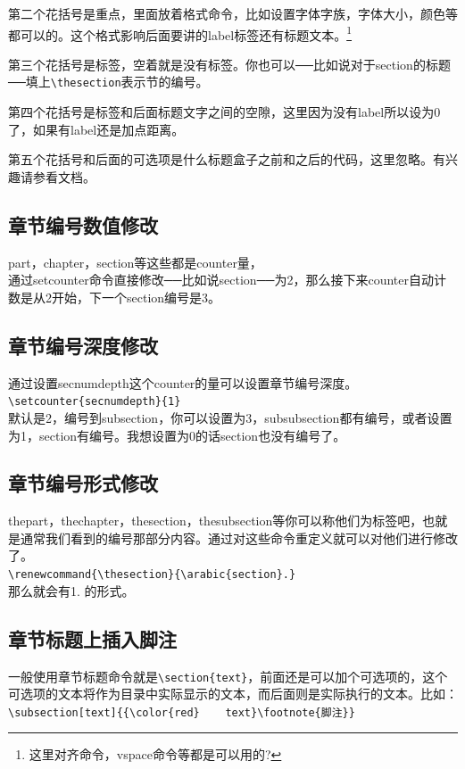 \documentclass[12pt,oneside]{book}
\begin{document}
\begin{common-format}
第二个花括号是重点，里面放着格式命令，比如设置字体字族，字体大小，颜色等都可以的。这个格式影响后面要讲的label标签还有标题文本。\footnote{这里对齐命令，vspace命令等都是可以用的?}

第三个花括号是标签，空着就是没有标签。你也可以──比如说对于section的标题──填上\verb+\thesection+表示节的编号。

第四个花括号是标签和后面标题文字之间的空隙，这里因为没有label所以设为0了，如果有label还是加点距离。

第五个花括号和后面的可选项是什么标题盒子之前和之后的代码，这里忽略。有兴趣请参看文档。


\subsection{章节编号数值修改}
part，chapter，section等这些都是counter量，\\通过setcounter命令直接修改──比如说section──为2，那么接下来counter自动计数是从2开始，下一个section编号是3。

\subsection{章节编号深度修改}
通过设置secnumdepth这个counter的量可以设置章节编号深度。\\
\verb+\setcounter{secnumdepth}{1} +\\
默认是2，编号到subsection，你可以设置为3，subsubsection都有编号，或者设置为1，section有编号。我想设置为0的话section也没有编号了。

\subsection{章节编号形式修改}
\label{sec:章节编号形式修改}
thepart，thechapter，thesection，thesubsection等你可以称他们为标签吧，也就是通常我们看到的编号那部分内容。通过对这些命令重定义就可以对他们进行修改了。\\
\verb+\renewcommand{\thesection}{\arabic{section}.}+\\
那么就会有1. 的形式。

\subsection{章节标题上插入脚注}
一般使用章节标题命令就是\verb+\section{text}+，前面还是可以加个可选项的，这个可选项的文本将作为目录中实际显示的文本，而后面则是实际执行的文本。比如：\\
\verb+\subsection[text]{{\color{red}    text}\footnote{脚注}}+

\end{common-format}
\end{document}
